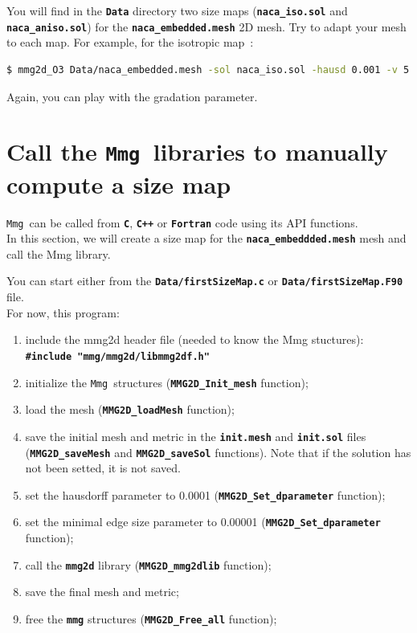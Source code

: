 \documentclass{article}
\newcommand{\ttb}[1]{\texttt{\textbf{#1}}}
\newcommand{\mmg}{\texttt{Mmg}}
\begin{document}
\begin{figure}
\centering

\end{figure}


You will find in the \ttb{Data} directory two size maps (\ttb{naca\_iso.sol} and
\ttb{naca\_aniso.sol}) for the
\ttb{naca\_embedded.mesh} 2D mesh. Try to adapt your mesh to each map. For
example, for the isotropic map~:
\begin{lstlisting}[language=bash]
$ mmg2d_O3 Data/naca_embedded.mesh -sol naca_iso.sol -hausd 0.001 -v 5
\end{lstlisting}

Again, you can play with the gradation parameter.

\section{Call the \mmg\ libraries to manually compute a size map\label{size_map}}
\mmg\ can be called from \ttb{C}, \ttb{C++} or \ttb{Fortran} code
using its API functions.\\

In this section, we will create a size map for the
\ttb{naca\_embeddded.mesh} mesh and call the Mmg library.

 You can
start either from the \ttb{Data/firstSizeMap.c} or
\ttb{Data/firstSizeMap.F90} file.\\
 For now, this program:
\begin{enumerate}
\item include the mmg2d header file (needed to know the Mmg stuctures):\\
\ttb{\#include "mmg/mmg2d/libmmg2df.h"}

\item initialize the \mmg\ structures (\ttb{MMG2D\_Init\_mesh} function);
\item load the mesh (\ttb{MMG2D\_loadMesh} function);
\item save the initial mesh and metric in the \ttb{init.mesh} and
  \ttb{init.sol} files (\ttb{MMG2D\_saveMesh} and \ttb{MMG2D\_saveSol}
  functions). Note that if the solution has not been setted, it is not saved.
\item set the hausdorff parameter to 0.0001 (\ttb{MMG2D\_Set\_dparameter} function);
\item set the minimal edge size parameter to 0.00001 (\ttb{MMG2D\_Set\_dparameter} function);
\item call the \ttb{mmg2d} library (\ttb{MMG2D\_mmg2dlib} function);
\item save the final mesh and metric;
\item free the \ttb{mmg} structures (\ttb{MMG2D\_Free\_all} function);\\
\end{enumerate}
\end{document}

